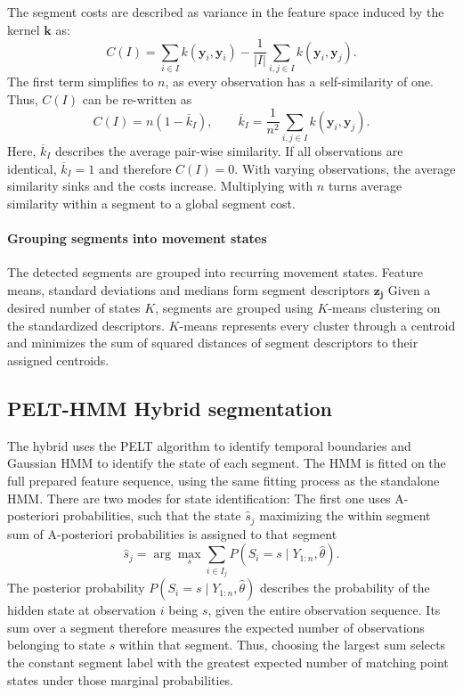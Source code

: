 The segment costs are described as variance in the feature space induced by the kernel $\textbf{k}$ as:
\[
        C(I)
        =
        \sum_{i\in I}k(\mathbf y_i,\mathbf y_i)
        -
        \frac{1}{|I|}
        \sum_{i,j\in I}k(\mathbf y_i,\mathbf y_j).
    \]
The first term simplifies to $n$, as every observation has a self-similarity of one.
Thus, $C(I)$ can be re-written as
\[
C(I)=n\left(1-\overline{k}_I\right),
\qquad
\overline{k}_I=
\frac1{n^2}\sum_{i,j\in I}k(\mathbf y_i,\mathbf y_j).
\]
Here, $\overline{k}_I$ describes the average pair-wise similarity.
If all observations are identical, $\overline{k}_I=1$ and therefore $C(I)=0$.
With varying observations, the average similarity sinks and the costs increase.
Multiplying with $n$ turns average similarity within a segment to a global segment cost.

\paragraph{Grouping segments into movement states}
The detected segments are grouped into recurring movement states.
Feature means, standard deviations and medians form segment descriptors $\mathbf{z_j}$
Given a desired number of states $K$, segments are grouped using $K$-means clustering on the standardized descriptors.
$K$-means represents every cluster through a centroid and minimizes the sum of squared distances of segment descriptors to their assigned centroids.

\subsection{PELT-HMM Hybrid segmentation}
\label{subsec:pelt-hmm-hybrid-segmentation}
The hybrid uses the PELT algorithm to identify temporal boundaries and Gaussian HMM to identify the state of each segment.
The HMM is fitted on the full prepared feature sequence, using the same fitting process as the standalone HMM.
There are two modes for state identification:
The first one uses A-posteriori probabilities, such that the state $\hat{s}_j$ maximizing the within segment sum of A-posteriori probabilities is assigned
to that segment
\[
\hat s_j=\arg\max_s\sum_{i\in I_j}
P(S_i=s\mid Y_{1:n},\hat\theta).
\]
The posterior probability $P(S_i=s\mid Y_{1:n},\hat\theta)$
describes the probability of the hidden state at observation
$i$ being $s$, given the entire observation sequence.
Its sum over a segment therefore measures the expected
number of observations belonging to state $s$ within that segment.
Thus, choosing the largest sum selects the constant segment label with the greatest expected number of matching point states under those marginal probabilities.

